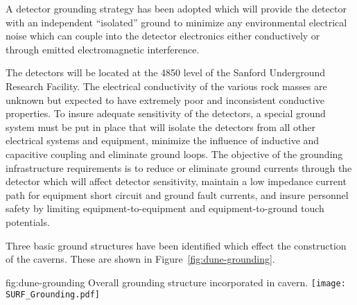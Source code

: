 A detector grounding strategy has been adopted which will provide the
detector with an independent ``isolated'' ground to minimize any
environmental electrical noise which can couple into the detector
electronics either conductively or through emitted electromagnetic
interference.


The detectors will be located at the 4850 level of the Sanford
Underground Research Facility. The electrical conductivity of the
various rock masses are unknown but expected to have extremely poor
and inconsistent conductive properties. To insure adequate sensitivity
of the detectors, a special ground system must be put in place that
will isolate the detectors from all other electrical systems and
equipment, minimize the influence of inductive and capacitive coupling
and eliminate ground loops. The objective of the grounding
infrastructure requirements is to reduce or eliminate ground currents
through the detector which will affect detector sensitivity, maintain
a low impedance current path for equipment short circuit and ground
fault currents, and insure personnel safety by limiting
equipment-to-equipment and equipment-to-ground touch potentials.


Three basic ground structures have been identified which effect the
construction of the caverns.  These are shown in
Figure~\ref{fig:dune-grounding}.
\begin{dunefigure}{fig:dune-grounding}
  {Overall  grounding structure incorporated in cavern.}
  \texttt{[image: SURF\_Grounding.pdf]}
\end{dunefigure}


